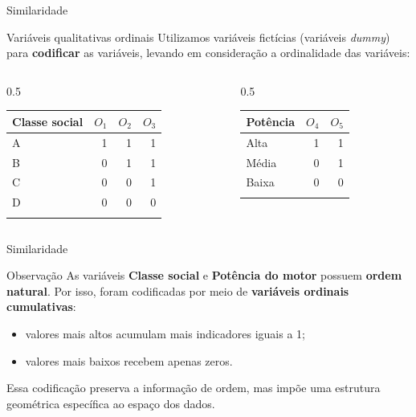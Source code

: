 \documentclass[
  ignorenonframetext,
  aspectratio=169,
]{beamer}
\newcounter{none} %
\providecommand{\tightlist}{%
  \setlength{\itemsep}{0pt}\setlength{\parskip}{0pt}}
\begin{document}
\begin{frame}{Similaridade}
\protect{}\label{similaridade-3}
\begin{block}{Variáveis qualitativas ordinais}
\protect{}\label{variuxe1veis-qualitativas-ordinais}
Utilizamos variáveis fictícias (variáveis \emph{dummy}) para
\textbf{codificar} as variáveis, levando em consideração a ordinalidade
das variáveis:

\begin{columns}[T]
\begin{column}{0.5\linewidth}
{\def\LTcaptype{none} %
\begin{longtable}[]{@{}lrrr@{}}
\toprule\noalign{}
Classe social & \(O_1\) & \(O_2\) & \(O_3\) \\
\midrule\noalign{}
\endhead
A & 1 & 1 & 1 \\
B & 0 & 1 & 1 \\
C & 0 & 0 & 1 \\
D & 0 & 0 & 0 \\
\bottomrule\noalign{}
\end{longtable}
}
\end{column}

\begin{column}{0.5\linewidth}
{\def\LTcaptype{none} %
\begin{longtable}[]{@{}lrr@{}}
\toprule\noalign{}
Potência & \(O_4\) & \(O_5\) \\
\midrule\noalign{}
\endhead
Alta & 1 & 1 \\
Média & 0 & 1 \\
Baixa & 0 & 0 \\
\bottomrule\noalign{}
\end{longtable}
}
\end{column}
\end{columns}
\end{block}
\end{frame}

\begin{frame}{Similaridade}
\protect{}\label{similaridade-4}
\begin{block}{Observação}
\protect{}\label{observauxe7uxe3o}
As variáveis \textbf{Classe social} e \textbf{Potência do motor} possuem
\textbf{ordem natural}. Por isso, foram codificadas por meio de
\textbf{variáveis ordinais cumulativas}:

\begin{itemize}
\tightlist
\item
  valores mais altos acumulam mais indicadores iguais a 1;
\item
  valores mais baixos recebem apenas zeros.
\end{itemize}

Essa codificação preserva a informação de ordem, mas impõe uma estrutura
geométrica específica ao espaço dos dados.
\end{block}
\end{frame}
\end{document}
